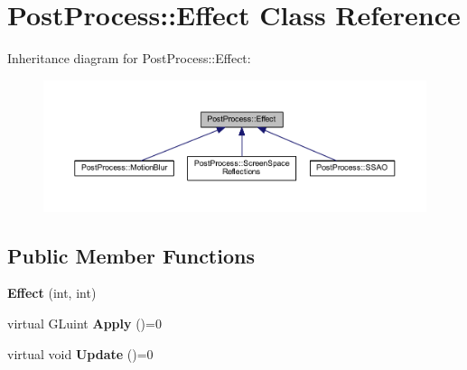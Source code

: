 \hypertarget{class_post_process_1_1_effect}{}\section{Post\+Process\+:\+:Effect Class Reference}
\label{class_post_process_1_1_effect}


Inheritance diagram for Post\+Process\+:\+:Effect\+:
\nopagebreak
\begin{figure}[H]
\begin{center}
\leavevmode
\includegraphics[width=350pt]{class_post_process_1_1_effect__inherit__graph}
\end{center}
\end{figure}
\subsection*{Public Member Functions}
\begin{DoxyCompactItemize}
\item 
{\bfseries Effect} (int, int)\hypertarget{class_post_process_1_1_effect_afbe32efd41c1801c3363e0e31afe57f5}{}\label{class_post_process_1_1_effect_afbe32efd41c1801c3363e0e31afe57f5}

\item 
virtual G\+Luint {\bfseries Apply} ()=0\hypertarget{class_post_process_1_1_effect_a1e09ae1bf1de1570aedbbf1a7fd4a7a5}{}\label{class_post_process_1_1_effect_a1e09ae1bf1de1570aedbbf1a7fd4a7a5}

\item 
virtual void {\bfseries Update} ()=0\hypertarget{class_post_process_1_1_effect_aec304379a238501f3d77530897e643b8}{}\label{class_post_process_1_1_effect_aec304379a238501f3d77530897e643b8}

\end{DoxyCompactItemize}
